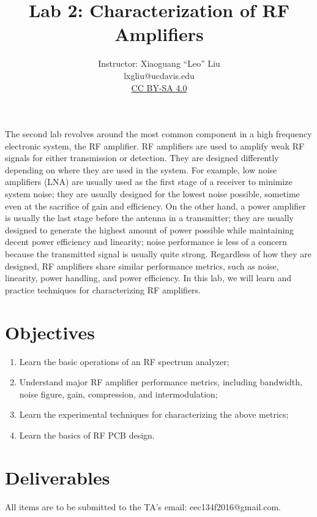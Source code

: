\documentclass[letterpaper, 11pt]{article}
\begin{document}
\title{Lab 2: Characterization of RF Amplifiers}
\author{Instructor: Xiaoguang ``Leo'' Liu\\lxgliu@ucdavis.edu \\
	\small \href{http://creativecommons.org/licenses/by-sa/4.0/}{CC BY-SA 4.0}}
\date{}

\maketitle

The second lab revolves around the most common component in a high frequency electronic system, the RF amplifier. RF amplifiers are used to amplify weak RF signals for either transmission or detection. They are designed differently depending on where they are used in the system. For example, low noise amplifiers (LNA) are usually used as the first stage of a receiver to minimize system noise; they are usually designed for the lowest noise possible, sometime even at the sacrifice of gain and efficiency. On the other hand, a power amplifier is usually the last stage before the antenna in a transmitter; they are usually designed to generate the highest amount of power possible while maintaining decent power efficiency and linearity; noise performance is less of a concern because the transmitted signal is usually quite strong. Regardless of how they are designed, RF amplifiers share similar performance metrics, such as noise, linearity, power handling, and power efficiency. In this lab, we will learn and practice techniques for characterizing RF amplifiers. 

\section{Objectives}

\begin{enumerate}[itemsep=0.1ex]
	\item Learn the basic operations of an RF spectrum analyzer;
	\item Understand major RF amplifier performance metrics, including bandwidth, noise figure, gain, compression, and intermodulation;
	\item Learn the experimental techniques for characterizing the above metrics;
	\item Learn the basics of RF PCB design. 
\end{enumerate}

\newpage
\section{Deliverables}
All items are to be submitted to the TA's email: eec134f2016@gmail.com.  
\end{document}
